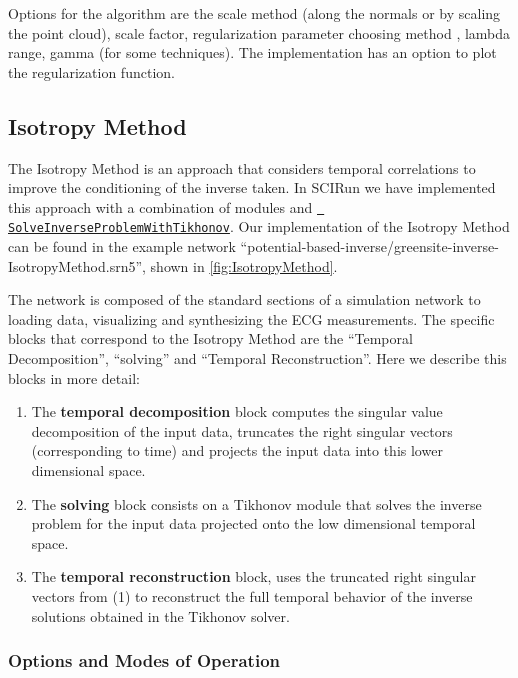 Options for the algorithm are the scale method (along the normals or
by scaling the point cloud), scale factor, regularization parameter
choosing method \cite{JDT:Joh2018}, lambda range, gamma (for some
techniques).  The implementation has an option to plot the
regularization function.




	
	
    
   
\subsection{Isotropy Method}
    
	The Isotropy Method is an approach that considers temporal
	correlations to improve the conditioning of the inverse taken.  In
	SCIRun we have implemented this approach with a combination of
	modules and
	\href{http://scirundocwiki.sci.utah.edu/SCIRunDocs/index.php/CIBC:Documentation:SCIRun:Reference:BioPSE:SolveInverseProblemWithTikhonov}{{\tt
	SolveInverseProblemWithTikhonov}}.  Our implementation of the
	Isotropy Method can be found in the example network
	``potential-based-inverse/greensite-inverse-IsotropyMethod.srn5'',
	shown in \autoref{fig:IsotropyMethod}.
    
	The network is composed of the standard sections of a simulation
	network to loading data, visualizing and synthesizing the ECG
	measurements.  The specific blocks that correspond to the Isotropy
	Method are the ``Temporal Decomposition'', ``solving'' and
	``Temporal Reconstruction''.  Here we describe this blocks in more
	detail:
    \begin{enumerate}
		\item The {\bf temporal decomposition} block computes the
		singular value decomposition of the input data, truncates the
		right singular vectors (corresponding to time) and projects
		the input data into this lower dimensional space.  
		\item The {\bf solving } block consists on a Tikhonov module
		that solves the inverse problem for the input data projected
		onto the low dimensional temporal space.
		\item The {\bf temporal reconstruction} block, uses the
		truncated right singular vectors from (1) to reconstruct the
		full temporal behavior of the inverse solutions obtained in
		the Tikhonov solver.
    \end{enumerate}

    \subsubsection{Options and Modes of Operation}
    
